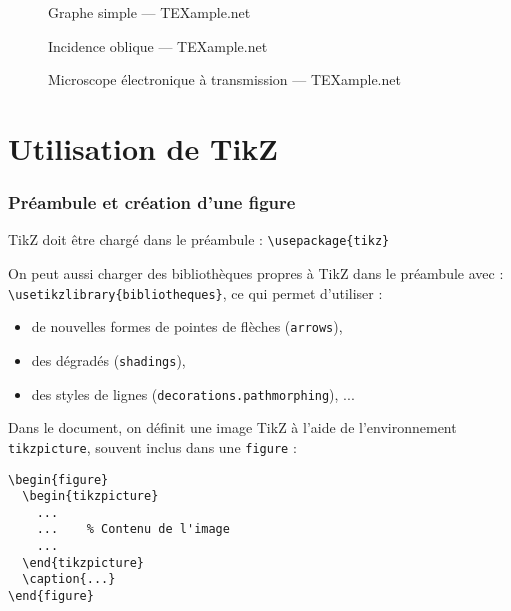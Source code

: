 \begin{frame}
  \begin{figure}
    \centering
    \tikzexc
    \caption{\footnotesize Graphe simple --- TEXample.net \cite{tikzandpgfexamples}}
  \end{figure}
\end{frame}

\begin{frame}
  \begin{figure}
    \centering
    \scalebox{0.7}{\tikzexd}
    \caption{\footnotesize Incidence oblique --- TEXample.net \cite{tikzandpgfexamples}}
  \end{figure}
\end{frame}

\begin{frame}
  \begin{figure}
    \centering
    \scalebox{0.7}{\tikzexb}
    \caption{\footnotesize Microscope électronique à transmission --- TEXample.net \cite{tikzandpgfexamples}}
  \end{figure}
\end{frame}



\section{Utilisation de TikZ}

\begin{frame}[fragile]
  \frametitle{Préambule et création d'une figure}

TikZ doit être chargé dans le préambule :
\lstinline?\usepackage{tikz}?

\medskip
On peut aussi charger des bibliothèques propres à TikZ dans le préambule avec :
\lstinline?\usetikzlibrary{bibliotheques}?,
ce qui permet d'utiliser :
\begin{itemize}
  \item de nouvelles formes de pointes de flèches (\lstinline?arrows?),
  \item des dégradés (\lstinline?shadings?),
  \item des styles de lignes (\lstinline?decorations.pathmorphing?), ...
\end{itemize}

\bigskip
Dans le document, on définit une image TikZ à l'aide de l'environnement \lstinline?tikzpicture?,
souvent inclus dans une \lstinline?figure? :

\begin{lstlisting}
\begin{figure}
  \begin{tikzpicture}
    ...
    ...    % Contenu de l'image
    ...
  \end{tikzpicture}
  \caption{...}
\end{figure}
\end{lstlisting}
\end{frame}




